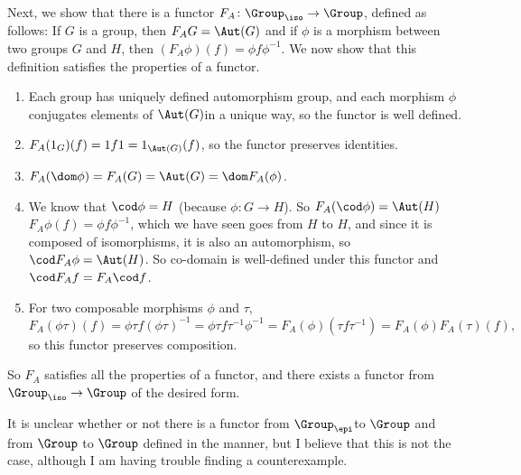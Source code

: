\documentclass[main.tex]{subfiles}
\begin{document}
Next, we show that there is a functor $F_A\colon \Group_\iso \rightarrow \Group$,
defined as follows: If $G$ is a group, then $F_AG = \Aut(G)$ and if $\phi$ is a
morphism between two groups $G$ and $H$, then $(F_A\phi)(f) = \phi f \phi^{-1}$.
We now show that this definition satisfies the properties of a functor.
\begin{enumerate}
	\item Each group has uniquely defined automorphism group, and each morphism
		$\phi$ conjugates elements of $\Aut(G)$in a unique way, so the functor is
		well defined.

	\item $F_A(1_G)(f) = 1f1 = 1_{\Aut(G)}(f)$, so the functor preserves
		identities.

	\item $F_A(\dom \phi) = F_A(G) = \Aut(G) =\dom F_A(\phi)$.

	\item We know that $\cod\phi = H$ (because $\phi\colon G \rightarrow H$). So
		$F_A(\cod\phi) = \Aut(H)$ $F_A\phi(f) = \phi f \phi^{-1}$, which we have
		seen goes from $H$ to $H$, and since it is composed of isomorphisms, it
		is also an automorphism, so $\cod F_A\phi = \Aut(H)$. So co-domain is
		well-defined under this functor and $\cod F_Af = F_A\cod f$.

	\item For two composable morphisms $\phi$ and $\tau$, \[F_A(\phi\tau)(f) =
			\phi\tau f (\phi\tau)^{-1} = \phi \tau f \tau^{-1} \phi^{-1} =
		F_A(\phi)(\tau f \tau^{-1}) = F_A(\phi)F_A(\tau)(f),\] so this functor
		preserves composition.
\end{enumerate}
So $F_A$ satisfies all the properties of a functor, and there exists a functor
from $\Group_\iso \rightarrow \Group$ of the desired form.

It is unclear whether or not there is a functor from  $\Group_\epi$to $\Group$
and from $\Group$ to $\Group$ defined in the manner, but I believe that this is
not the case, although I am having trouble finding a counterexample.
\end{document}
